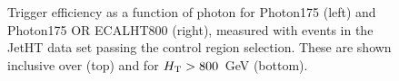 \begin{figure}[h!]
\begin{center}
    \caption{Trigger efficiency as a function of photon \Pt for Photon175 (left) and Photon175 OR ECALHT800 (right), measured with events in the JetHT data set passing the \gj control region selection. These are shown inclusive over \scalht (top) and for $\mbox{$H_\text{T}$} > 800$~GeV (bottom).}
    \label{fig:photon_turnons}
  \end{center}
\end{figure}






